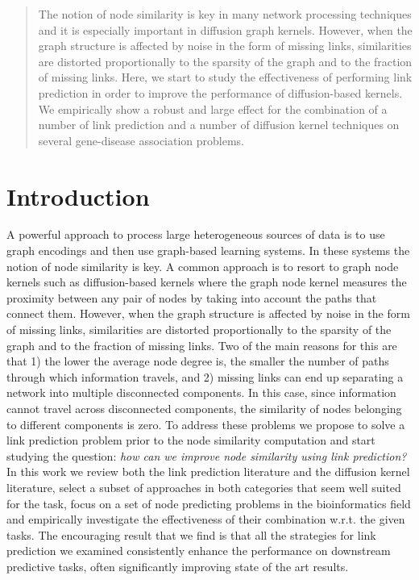 
\begin{abstract}

The notion of node similarity is key in many network processing techniques and
it is especially important in diffusion graph kernels. However, when the graph
structure is affected by noise in the form of missing links, similarities are
distorted  proportionally to the sparsity of the graph and to the fraction of
missing links. Here, we start to study the effectiveness of performing link
prediction  in order to improve the performance of diffusion-based kernels. We
empirically show a robust and large effect for the combination of a number of
link prediction and a number of diffusion kernel techniques on several
gene-disease association problems.

\end{abstract}


\section{Introduction}

A powerful approach to process large heterogeneous sources of data is to use
graph encodings \cite{proceeding1} \cite{jour1} and then use graph-based
learning systems. In these systems the notion of node similarity is key. A
common approach is to resort to graph node kernels such as diffusion-based
kernels \cite{proceeding2} where the graph node kernel measures the proximity
between any pair of nodes by taking into account the paths that connect them.
However, when the graph structure is affected by noise in the form of missing
links, similarities are distorted  proportionally to the sparsity of the graph
and to the fraction of missing links. Two of the main reasons for this are
that 1) the lower the average node degree is, the smaller the number of paths
through which information travels, and 2) missing links can end up separating
a network into multiple disconnected components. In this case, since
information cannot travel across disconnected components, the similarity of
nodes belonging to different components is zero. To address these problems we
propose to solve  a link prediction problem prior to the node similarity
computation and start studying the question: {\em how can we improve node
similarity using link prediction?} In this work we review both the link
prediction literature and the diffusion kernel literature, select a subset of
approaches in both categories that seem well suited for the task, focus on a
set of node predicting problems in the bioinformatics field and empirically
investigate the effectiveness of their combination w.r.t. the given tasks. The
encouraging result that we find is that all the strategies for link prediction we
examined consistently enhance the performance on downstream predictive tasks,
often significantly improving state of the art results.